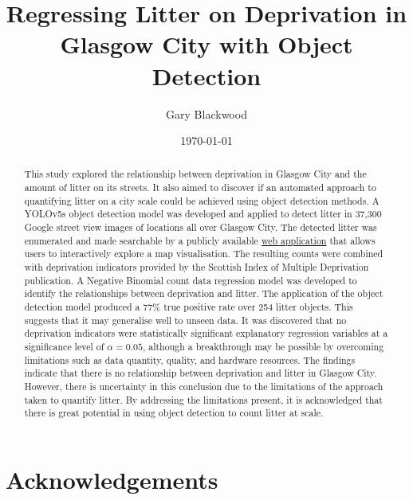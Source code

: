 \documentclass{thesis}
\begin{document}

\title{Regressing Litter on Deprivation in Glasgow City with Object Detection}
\author{Gary Blackwood}
\date{\today}
\maketitle


\begin{abstract}

This study explored the relationship between deprivation in Glasgow City and the amount of litter on its streets. It also aimed to discover if an automated approach to quantifying litter on a city scale could be achieved using object detection methods. A YOLOv5s object detection model was developed and applied to detect litter in 37,300 Google street view images of locations all over Glasgow City. The detected litter was enumerated  and made searchable by a publicly available \href{https://glasgow-litter.garyblackwood.co.uk}{web application} that allows users to interactively explore a map visualisation. The resulting counts were combined with deprivation indicators provided by the Scottish Index of Multiple Deprivation publication. A Negative Binomial count data regression model was developed to identify the relationships between deprivation and litter. The application of the object detection model produced a 77\% true positive rate over 254 litter objects. This suggests that it may generalise well to unseen data. It was discovered that no deprivation indicators were statistically significant explanatory regression variables at a significance level of $\alpha = 0.05$, although a breakthrough may be possible by overcoming limitations such as data quantity, quality, and hardware resources. The findings indicate that there is no relationship between deprivation and litter in Glasgow City. However, there is uncertainty in this conclusion due to the limitations of the approach taken to quantify litter. By addressing the limitations present, it is acknowledged that there is great potential in using object detection to count litter at scale.

\end{abstract}


\chapter*{Acknowledgements}
\end{document}
